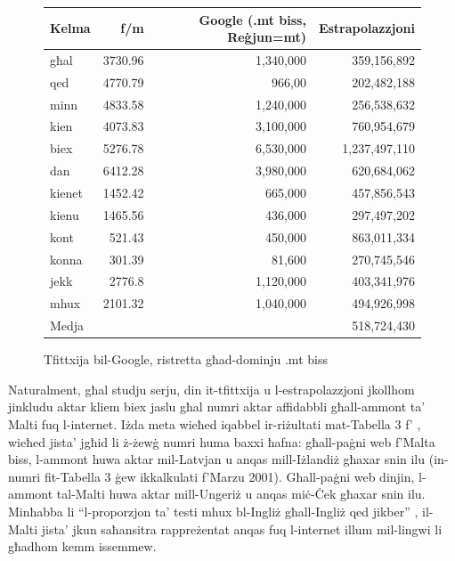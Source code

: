 \documentclass[]{../../metanetpaper}
\begin{document}
\begin{multicols}{2}
\begin{figure}[tb]
\setlength{\tabcolsep}{2.5em}
\begin{tabularx}{\textwidth}{lrrr} \toprule\addlinespace
Kelma & f/m & Google (.mt biss, Reġjun=mt) & Estrapolazzjoni \\
\hline
għal & 3730.96 & 1,340,000 & 359,156,892 \\
qed	& 4770.79 & 966,00  &  202,482,188  \\
minn & 4833.58 & 1,240,000  &  256,538,632 \\
kien & 4073.83 & 3,100,000  &  760,954,679 \\
biex & 5276.78 & 6,530,000  & 1,237,497,110 \\
dan	& 6412.28  & 3,980,000  & 620,684,062  \\
kienet & 1452.42  & 665,000 &  457,856,543 \\
kienu & 1465.56  & 436,000  & 297,497,202  \\
kont & 521.43  & 450,000  &  863,011,334 \\
konna & 301.39  & 81,600  &   270,745,546\\
jekk & 2776.8  &  1,120,000 & 403,341,976 \\
mhux & 2101.32  & 1,040,000  &  494,926,998 \\
\hline
Medja & & & 518,724,430 \\
\hline
\end{tabularx} 
\caption{Tfittxija bil-Google, ristretta għad-dominju .mt biss}
\label{table:Google_B_mt}
\end{figure}

Naturalment, għal studju serju, din it-tfittxija u l-estrapolazzjoni jkollhom jinkludu aktar kliem biex jaslu għal numri aktar affidabbli għall-ammont ta’ Malti fuq l-internet. Iżda meta wieħed iqabbel ir-riżultati mat-Tabella 3 f’ \cite{Kilgarriff-Grefenstette:2003}, wieħed jista’ jgħid li ż-żewġ numri huma baxxi ħafna: għall-paġni web f’Malta biss, l-ammont huwa aktar mil-Latvjan u anqas mill-Iżlandiż għaxar snin ilu (in-numri fit-Tabella 3 ġew ikkalkulati f’Marzu 2001). Għall-paġni web dinjin, l-ammont tal-Malti huwa aktar mill-Ungeriż u anqas miċ-Ċek għaxar snin ilu. Minħabba li ``l-proporzjon ta’ testi mhux bl-Ingliż għall-Ingliż qed jikber'' \cite{Kilgarriff-Grefenstette:2003}, il-Malti jista’ jkun saħansitra rappreżentat anqas fuq l-internet illum mil-lingwi li għadhom kemm issemmew.


\end{multicols}
\end{document}

